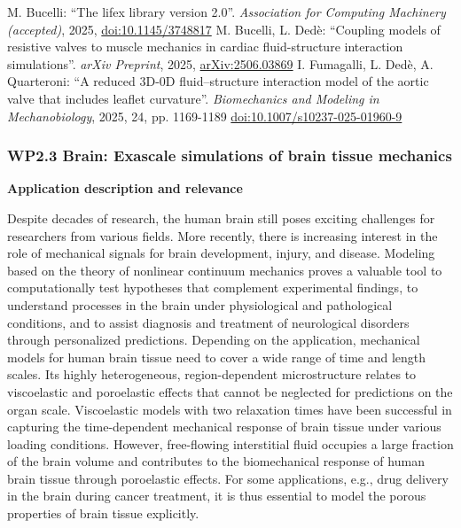 \documentclass[a4paper,12pt, numbers]{article}
\begin{document}
\begin{thebibliography}{10}
	 M. Bucelli: ``The lifex library version 2.0''. \emph{Association for Computing Machinery (accepted)}, 2025, \href{https://doi.org/10.1145/3748817}{doi:10.1145/3748817}
	 M. Bucelli, L. Ded\`e: ``Coupling models of resistive valves to muscle mechanics in cardiac fluid-structure interaction simulations''. \emph{arXiv Preprint}, 2025, \href{https://https://arxiv.org/abs/2506.03869}{arXiv:2506.03869}
	 I. Fumagalli, L. Ded\`e, A. Quarteroni: ``A reduced 3D-0D fluid–structure interaction model of the aortic valve that includes leaflet curvature''. \emph{Biomechanics and Modeling in Mechanobiology}, 2025, 24, pp. 1169-1189 \href{https://doi.org/10.1007/s10237-025-01960-9}{doi:10.1007/s10237-025-01960-9}
\end{thebibliography}


\subsubsection*{WP2.3 Brain: Exascale simulations of brain tissue mechanics}

\noindent\textbf{Application description and relevance}

Despite decades of research, the human brain still poses exciting challenges for researchers from various fields.
More recently, there is increasing interest in the role of mechanical signals for brain development, injury, and disease.
Modeling based on the theory of nonlinear continuum mechanics proves a valuable tool to computationally test hypotheses that complement experimental findings, to understand processes in the brain under physiological and pathological conditions, and to assist diagnosis and treatment of neurological disorders through personalized predictions.
Depending on the application, mechanical models for human brain tissue need to cover a wide range of time and length scales.
Its highly heterogeneous, region-dependent microstructure relates to viscoelastic and poroelastic effects that cannot be neglected for predictions on the organ scale.
Viscoelastic models with two relaxation times have been successful in capturing the time-dependent mechanical response of brain tissue under various loading conditions.
However, free-flowing interstitial fluid occupies a large fraction of the brain volume and contributes to the biomechanical response of human brain tissue through poroelastic effects.
For some applications, e.g., drug delivery in the brain during cancer treatment, it is thus essential to model the porous properties of brain tissue explicitly.
\end{document}
